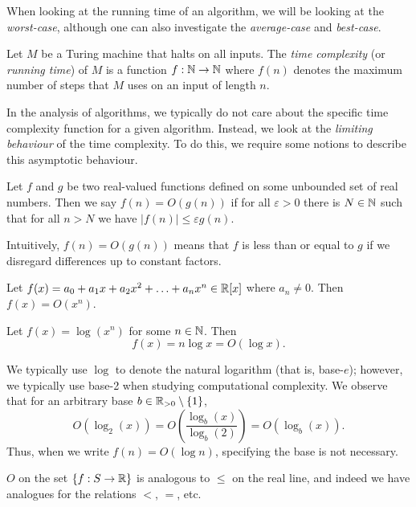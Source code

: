 When looking at the running time of an algorithm, we will be looking at the \emph{worst-case}, although one can also investigate the \emph{average-case} and \emph{best-case}.

\begin{definition}
  Let $M$ be a Turing machine that halts on all inputs. The \emph{time complexity} (or \emph{running time}) of $M$ is a function $f: \mathbb N \to \mathbb N$ where $f(n)$ denotes the maximum number of steps that $M$ uses on an input of length $n$. 
\end{definition}

In the analysis of algorithms, we typically do not care about the specific time complexity function for a given algorithm. Instead, we look at the \emph{limiting behaviour} of the time complexity. To do this, we require some notions to describe this asymptotic behaviour.

\begin{definition}
  Let $f$ and $g$ be two real-valued functions defined on some unbounded set of real numbers. Then we say $f(n) = O(g(n))$ if for all $\varepsilon > 0$ there is $N \in \mathbb N$ such that for all $n > N$ we have $\lvert f(n) \rvert \leq \varepsilon g(n)$. 
\end{definition}

Intuitively, $f(n) = O(g(n))$ means that $f$ is less than or equal to $g$ if we disregard differences up to constant factors. 

\begin{example}
  Let $f(x) = a_0 + a_1x + a_2x^2 + \ldots + a_nx^n \in \mathbb R[x]$ where $a_n \neq 0$. Then $f(x) = O(x^n)$. 
\end{example}

\begin{example}
  Let $f(x) = \log(x^n)$ for some $n \in \mathbb N$. Then \[f(x) = n\log x = O(\log x).\]
\end{example}

\begin{remark}
  We typically use $\log$ to denote the natural logarithm (that is, base-$e$); however, we typically use base-2 when studying computational complexity. We observe that for an arbitrary base $b \in \mathbb R_{> 0} \setminus \{1\}$,
  \[ O(\log_2(x)) = O\left(\frac{\log_b(x)}{\log_b(2)}\right)=O(\log_b(x)). \]
  Thus, when we write $f(n) = O(\log n)$, specifying the base is not necessary. 
\end{remark}

$O$ on the set $\{f: S \to \mathbb R\}$ is analogous to $\leq$ on the real line, and indeed we have analogues for the relations $<$, $=$, etc.

